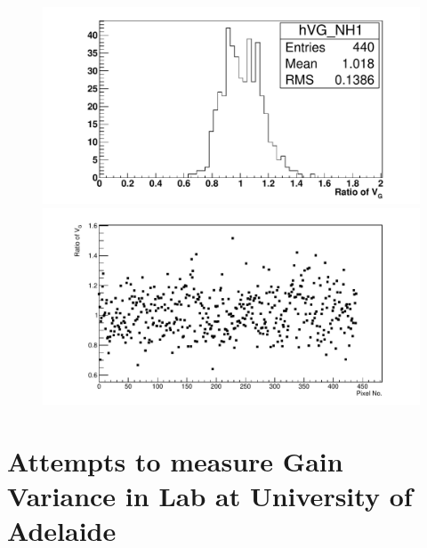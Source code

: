 \begin{figure} %
\includegraphics[width=\textwidth]{chapters/graphs/GainVarsMeas/LL_m04_2016-06-11/Set0and2/GainVairanceHist_Average_Method2.pdf}
\caption{}
\vspace{3mm}
\includegraphics[width=\textwidth]{chapters/graphs/GainVarsMeas/LL_m04_2016-06-11/Set0and2/GainVars_Vs_Pixel_GainVariance_Average_Method2_Set0and2.pdf}
\caption{}
\end{figure}

\section{Attempts to measure Gain Variance in Lab at University of Adelaide}